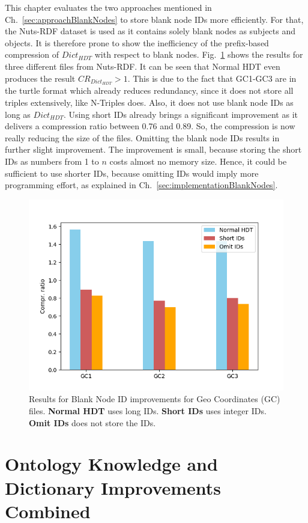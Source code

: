 This chapter evaluates the two approaches mentioned in Ch.~\ref{sec:approachBlankNodes} to store blank node IDs more efficiently. For that, the Nuts-RDF dataset is used as it contains solely blank nodes as subjects and objects. It is therefore prone to show the inefficiency of the prefix-based compression of $Dict_{HDT}$ with respect to blank nodes. Fig.~\ref{fig:blanknodes} shows the results for three different files from Nuts-RDF. It can be seen that Normal HDT even produces the result $CR_{Dict_{HDT}}>1$. This is due to the fact that GC1-GC3 are in the turtle format which already reduces redundancy, since it does not store all triples extensively, like N-Triples does. Also, it does not use blank node IDs as long as $Dict_{HDT}$. Using short IDs already brings a significant improvement as it delivers a compression ratio between 0.76 and 0.89. So, the compression is now really reducing the size of the files. Omitting the blank node IDs results in further slight improvement. The improvement is small, because storing the short IDs as numbers from 1 to $n$ costs almost no memory size. Hence, it could be sufficient to use shorter IDs, because omitting IDs would imply more programming effort, as explained in Ch.~\ref{sec:implementationBlankNodes}.


\begin{figure}
	\centering
	\includegraphics[width=0.7\linewidth]{figures/4_evaluation/blankNodes}
	\caption{Results for Blank Node ID improvements for Geo Coordinates (GC) files. \textbf{Normal HDT} uses long IDs. \textbf{Short IDs} uses integer IDs. \textbf{Omit IDs} does not store the IDs.}
	\label{fig:blanknodes}
\end{figure}


\section{Ontology Knowledge and Dictionary Improvements Combined}






























